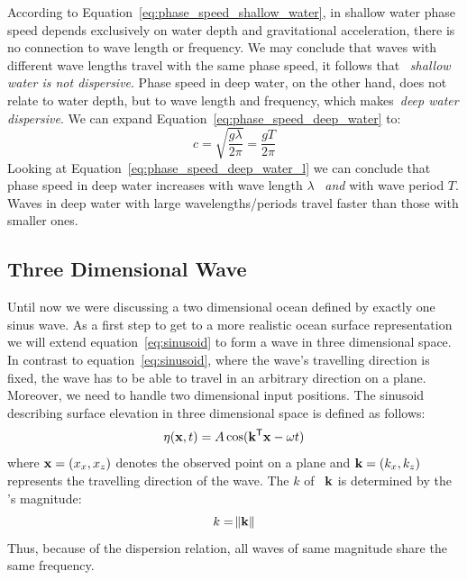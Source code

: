 %
According to Equation~\ref{eq:phase_speed_shallow_water}, in shallow water phase speed depends exclusively
on water depth and gravitational acceleration, there is no connection to wave length or frequency.
We may conclude that waves with different wave lengths travel with the same phase speed, it follows that
~\emph{shallow water is not dispersive}. Phase speed in deep water, on the other hand,
does not relate to water depth, but to wave length and frequency, which makes~\emph{deep water dispersive}.
We can expand Equation~\ref{eq:phase_speed_deep_water} to:
%
\begin{equation}
\label{eq:phase_speed_deep_water_l}
 c = \sqrt{\frac{g\lambda}{2\pi}} = \frac{gT}{2\pi}
\end{equation}
%
Looking at Equation~\ref{eq:phase_speed_deep_water_l} we can conclude that phase speed in deep water increases
with wave length $\lambda$ ~\emph{and} with wave period $T$. Waves in deep water with large wavelengths/periods
travel faster than those with smaller ones.
%
\subsection{Three Dimensional Wave}
Until now we were discussing a two dimensional ocean defined by exactly one sinus wave. As a first
step to get to a more realistic ocean surface representation we will extend equation~\ref{eq:sinusoid}
to form a wave in three dimensional space. In contrast to equation~\ref{eq:sinusoid}, where the wave's
travelling direction is fixed, the wave has to be able to travel in an arbitrary direction on a plane.
Moreover, we need to handle two dimensional input positions. The sinusoid describing surface elevation
in three dimensional space is defined as follows:
\begin{equation}
\label{eq:sinusoid_3d}
 \eta(\mathbf{x}, t) = A\cos(\mathbf{k}^{\mathsf{T}}\mathbf{x} - \omega t)
\end{equation}
where $\mathbf{x} = (x_x, x_z)$ denotes the observed point on a plane and $\mathbf{k} = (k_x, k_z)$ represents
the travelling direction of the wave. The \wavenumber $k$ of~\emph{\wavevector} $\mathbf{k}$ is determined by
the \wavevector's magnitude:
\begin{equation}
 k = \norm{\mathbf{k}}
\end{equation}
Thus, because of the dispersion relation, all waves of same magnitude share the same frequency.

